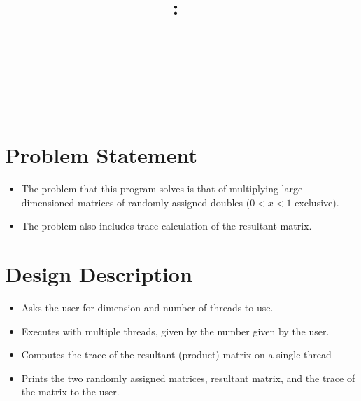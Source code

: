 \documentclass{article}
\title{
\vspace{2in}
\textmd{\textbf{\hmwkClass:\ \hmwkTitle}}\\
\normalsize\vspace{0.1in}\small{\hmwkDueDate}\\
\vspace{0.1in}\large{\textit{\hmwkClassInstructor\ \hmwkClassTime}}
\vspace{3in}
}
\author{\textbf{\hmwkAuthorName}\\\textbf{\lastCWID}}
\date{} %
\begin{document}
\maketitle



\newpage
\tableofcontents
\newpage


\section {Problem Statement}

\begin{itemize}
\item The problem that this program solves is that of multiplying large dimensioned matrices
of randomly assigned doubles (\(0 <  x <  1 \) exclusive).
\item The problem also includes trace calculation of the resultant matrix.
\end{itemize}
\clearpage




\section{Design Description}
\begin{itemize}
\item Asks the user for dimension and number of threads to use.
\item Executes with multiple threads, given by the number given by the user.
\item Computes the trace of the resultant (product) matrix on a single thread
\item Prints the two randomly assigned matrices, resultant matrix, and the trace of the matrix to the user.
\end{itemize}
\end{document}
